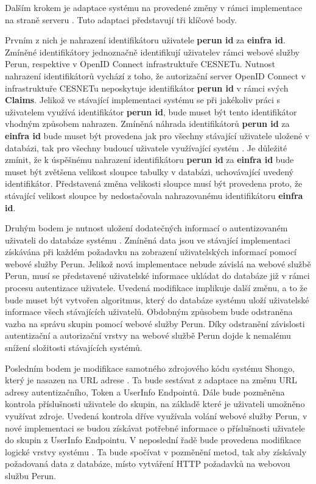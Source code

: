 \documentclass[
  printed, %
  twoside, %
  table,   %
  nolof,     %
  nolot,     %
]{fithesis3}
\begin{document}
Dalším krokem je adaptace systému  na provedené změny v rámci implementace na straně serveru . Tuto adaptaci představují tři klíčové body. 

\par 

Prvním z nich je nahrazení identifikátoru uživatele \textbf{perun id} za \textbf{einfra id}. Zmíněné identifikátory jednoznačně identifikují uživatele\break v rámci webové služby Perun, respektive v OpenID Connect infrastruktuře CESNETu. Nutnost nahrazení identifikátorů vychází z toho, že autorizační server OpenID Connect v infrastruktuře CESNETu neposkytuje identifikátor \textbf{perun id} v rámci svých \textbf{Claims}. Jelikož ve stávající implementaci systému  se při jakékoliv práci s uživatelem využívá identifikátor \textbf{perun id}, bude muset být tento identifikátor vhodným způsobem nahrazen. Zmíněná náhrada identifikátorů \textbf{perun id} za \textbf{einfra id} bude muset být provedena jak pro všechny stávající uživatele uložené v databázi, tak pro všechny budoucí uživatele využívající systém . Je důležité zmínit, že k úspěšnému nahrazení identifikátoru \textbf{perun id} za \textbf{einfra id} bude muset být zvětšena velikost sloupce tabulky v databázi, uchovávající uvedený identifikátor. Představená změna velikosti sloupce musí být provedena proto, že stávající velikost sloupce by nedostačovala nahrazovanému identifikátoru \textbf{einfra id}. 
\par

Druhým bodem je nutnost uložení dodatečných informací o autentizovaném uživateli do databáze systému . Zmíněná data jsou ve stávající implementaci získávána při každém požadavku na zobrazení uživatelských informací pomocí webové služby Perun. Jelikož nová implementace nebude závislá na webové službě Perun, musí se představené uživatelské informace ukládat do databáze již v rámci procesu autentizace uživatele. Uvedená modifikace implikuje další změnu, a to že bude muset být vytvořen algoritmus, který do databáze systému  uloží uživatelské informace všech stávajících uživatelů. Obdobným způsobem bude odstraněna vazba na správu skupin pomocí webové služby Perun. Díky odstranění závislosti autentizační a autorizační vrstvy na webové službě Perun dojde k nemalému snížení složitosti stávajících systémů. 
\par 

Posledním bodem je modifikace samotného zdrojového kódu systému Shongo, který je nasazen na URL adrese . Ta bude sestávat z adaptace na změnu URL adresy autentizačního, Token a UserInfo Endpointů. Dále bude pozměněna kontrola příslušnosti uživatele do skupin, na základě které je uživateli umožněno využívat zdroje. Uvedená kontrola dříve využívala volání webové služby Perun, v nové implementaci se budou získávat potřebné informace o příslušnosti uživatele do skupin z UserInfo Endpointu. V neposlední řadě bude provedena modifikace logické vrstvy systému . Ta bude spočívat v pozměnění metod, tak aby získávaly požadovaná data z databáze, místo vytváření HTTP požadavků na webovou službu Perun. 
\end{document}
